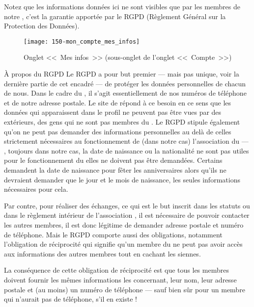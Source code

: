Notez que les informations données ici ne sont visibles que par les membres de notre \sel, c’est la garantie apportée par le RGPD (Règlement Général sur la Protection des Données).
\begin{figure}
    \texttt{[image: 150-mon\_compte\_mes\_infos]}
    \caption[Onglet <<~Mes infos~>>]{Onglet <<~Mes infos~>> (sous-onglet de l'onglet <<~Compte~>>)}
    \label{fig:mesInfos}
\end{figure}
\begin{mybox}[colbacktitle=MidnightBlue]{À propos du RGPD}
    Le RGPD a pour but premier --- mais pas unique, voir la dernière partie de cet encadré --- de protéger les données personnelles de chacun de nous. Dans le cadre du \sel{}, il s'agit essentiellement de nos numéros de téléphone et de notre adresse postale. Le site de \CF{} répond à ce besoin en ce sens que les données qui apparaissent dans le profil ne peuvent pas être vues par des extérieurs, \cad{} des gens qui ne sont pas membres du \CdS.
    \aster
    Le RGPD stipule également qu'on ne peut pas demander des informations personnelles au delà de celles strictement nécessaires au fonctionnement de (dans notre cas) l'association du \sel{} --- \ex, toujours dans notre cas, la date de naissance ou la nationalité ne sont pas utiles pour le fonctionnement du \sel{} elles ne doivent pas être demandées. Certains \sel{} demandent la date de naissance pour fêter les anniversaires alors  qu'ils ne devraient demander que le jour et le mois de naissance, les seules informations nécessaires pour cela.
    
    Par contre, pour réaliser des échanges, ce qui est le but inscrit dans les statuts ou dans le règlement intérieur de l'association \CdS, il est nécessaire de pouvoir contacter les autres membres, il est donc légitime de demander adresse postale et numéro de téléphone.
    \aster
    Mais le RGPD comporte aussi des obligations, notamment l'obligation de réciprocité qui signifie qu'un membre du \sel{} ne peut pas avoir accès aux informations des autres membres tout en cachant les siennes. 
    
    La conséquence de cette obligation de réciprocité est que tous les membres doivent fournir les mêmes informations les concernant, \cad{} leur nom, leur adresse postale et (au moins) un numéro de téléphone --- sauf bien sûr pour un membre qui n'aurait pas de téléphone, s'il en existe !
\end{mybox}

